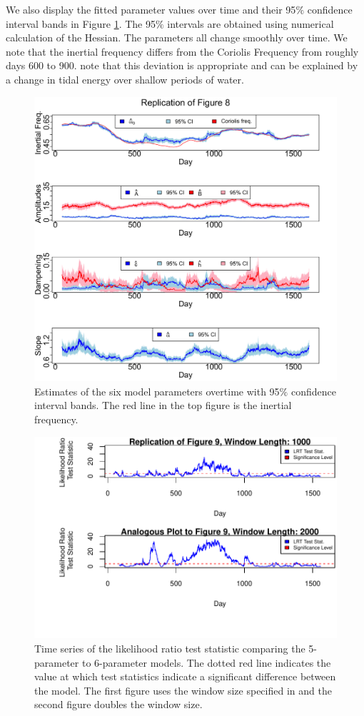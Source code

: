 \documentclass{stat572Style}
\begin{document}
   
 \par
 We also display the fitted parameter values over time and their 95$\%$ confidence interval bands in Figure \ref{fig: fig8}. 
The 95$\%$ intervals are obtained using numerical calculation of the Hessian.
The parameters all change smoothly over time. 
We note that the inertial frequency differs from the Coriolis Frequency from roughly days 600 to 900. 
\citet{Sykulski2016} note that this deviation is appropriate and can be explained by a change in tidal energy over shallow periods of water. 
 \begin{figure}[h!]
  \centering
    \includegraphics[width=.8\textwidth]{ReplicatedFigures/fig8.png}
        \caption{Estimates of the six model parameters overtime with 95$\%$ confidence interval bands. The red line in the top figure is the inertial frequency. }
        	\label{fig: fig8}
\end{figure}

 \begin{figure}[h!]
  \centering
    \includegraphics[width=\textwidth]{ReplicatedFigures/fig9Extend.pdf}
        \caption{Time series of the likelihood ratio test statistic comparing the 5-parameter to 6-parameter models. The dotted red line indicates the value at which test statistics indicate a significant difference between the model. The first figure uses the window size specified in \citet{Sykulski2016} and the second figure doubles the window size.}
        	\label{fig: fig9}
\end{figure}
\end{document}
